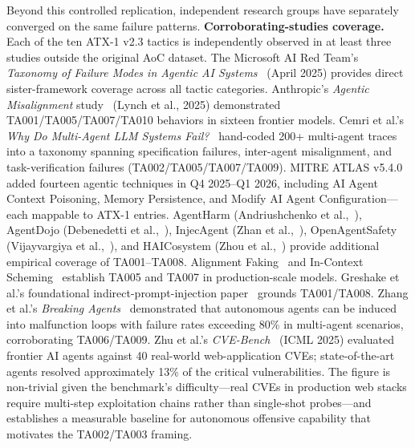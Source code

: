 \documentclass{IEEEoj-data}
\newcommand{\added}[1]{#1}
\begin{document}
\added{Beyond this controlled replication, independent research groups have separately converged on the same failure patterns. {\bf Corroborating-studies coverage.} Each of the ten ATX-1 v2.3 tactics is independently observed in at least three studies outside the original AoC dataset. The Microsoft AI Red Team's {\it Taxonomy of Failure Modes in Agentic AI Systems}~\mbox{\cite{ref17}} (April 2025) provides direct sister-framework coverage across all tactic categories. Anthropic's {\it Agentic Misalignment} study~\mbox{\cite{ref18}} (Lynch et al., 2025) demonstrated TA001/TA005/TA007/TA010 behaviors in sixteen frontier models. Cemri et al.'s {\it Why Do Multi-Agent LLM Systems Fail?}~\mbox{\cite{ref19}} hand-coded 200+ multi-agent traces into a taxonomy spanning specification failures, inter-agent misalignment, and task-verification failures (TA002/TA005/TA007/TA009). MITRE ATLAS v5.4.0~\mbox{\cite{ref3}} added fourteen agentic techniques in Q4 2025--Q1 2026, including AI Agent Context Poisoning, Memory Persistence, and Modify AI Agent Configuration---each mappable to ATX-1 entries. AgentHarm (Andriushchenko et al.,~\mbox{\cite{ref20}}), AgentDojo (Debenedetti et al.,~\mbox{\cite{ref21}}), InjecAgent (Zhan et al.,~\mbox{\cite{ref22}}), OpenAgentSafety (Vijayvargiya et al.,~\mbox{\cite{ref23}}), and HAICosystem (Zhou et al.,~\mbox{\cite{ref24}}) provide additional empirical coverage of TA001--TA008. Alignment Faking~\mbox{\cite{ref25}} and In-Context Scheming~\mbox{\cite{ref26}} establish TA005 and TA007 in production-scale models. Greshake et al.'s foundational indirect-prompt-injection paper~\mbox{\cite{ref27}} grounds TA001/TA008. Zhang et al.'s {\it Breaking Agents}~\mbox{\cite{ref31}} demonstrated that autonomous agents can be induced into malfunction loops with failure rates exceeding 80\% in multi-agent scenarios, corroborating TA006/TA009. Zhu et al.'s {\it CVE-Bench}~\mbox{\cite{ref32}} (ICML 2025) evaluated frontier AI agents against 40 real-world web-application CVEs; state-of-the-art agents resolved approximately 13\% of the critical vulnerabilities. The figure is non-trivial given the benchmark's difficulty---real CVEs in production web stacks require multi-step exploitation chains rather than single-shot probes---and establishes a measurable baseline for autonomous offensive capability that motivates the TA002/TA003 framing.}
\end{document}
